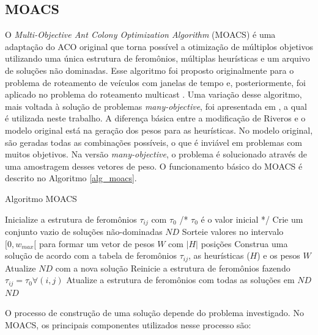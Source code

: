 \subsection{MOACS}

O \textit{Multi-Objective Ant Colony Optimization Algorithm} (MOACS) \cite{Baran2003} é uma adaptação do ACO original que torna possível a otimização de múltiplos objetivos utilizando uma única estrutura de feromônios, múltiplas heurísticas e um arquivo de soluções não dominadas. Esse algoritmo foi proposto originalmente para o problema de roteamento de veículos com janelas de tempo e, posteriormente, foi aplicado no problema do roteamento multicast \cite{Pinto2005}. Uma variação desse algoritmo, mais voltada à solução de problemas \textit{many-objective}, foi apresentada em \cite{Riveros2016}, a qual é utilizada neste trabalho. A diferença básica entre a modificação de Riveros e o modelo original está na geração dos pesos para as heurísticas. No modelo original, são geradas todas as combinações possíveis, o que é inviável em problemas com muitos objetivos. Na versão \textit{many-objective}, o problema é solucionado através de uma amostragem desses vetores de peso. O funcionamento básico do MOACS é descrito no Algoritmo \ref{alg_moacs}.

\begin{algorithm}
	\caption{Algoritmo MOACS}
	\label{alg_moacs}
	\begin{algorithmic}[1]
		\State Inicialize a estrutura de feromônios $\tau_{ij}$ com $\tau_0$ /* $\tau_{0}$ é o valor inicial */
		\State Crie um conjunto vazio de soluções não-dominadas $ND$
		\State Sorteie valores no intervalo $[0, w_{max}[$ para formar um vetor de pesos $W$ com $|H|$ posições
		\State Construa uma solução de acordo com a tabela de feromônios $\tau_{ij}$, as heurísticas ($H$) e os pesos $W$
		\State Atualize $ND$ com a nova solução
		\EndFor
		\State Reinicie a estrutura de feromônios fazendo $\tau_{ij} = \tau_0 \forall(i,j)$
		\Else
		\State Atualize a estrutura de feromônios com todas as soluções em $ND$
		\EndIf
		\EndWhile
		\State \Return $ND$
	\end{algorithmic}
\end{algorithm}

O processo de construção de uma solução depende do problema investigado. No MOACS, os principais componentes utilizados nesse processo são:

